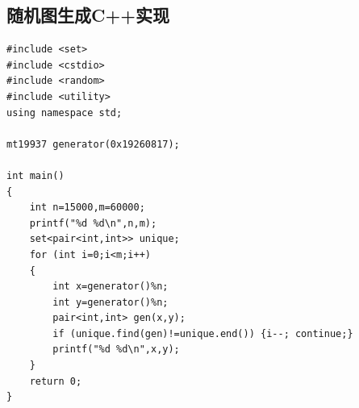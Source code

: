 \documentclass{article}
\begin{document}
\subsection{随机图生成C++实现}

\begin{lstlisting}
#include <set>
#include <cstdio>
#include <random>
#include <utility>
using namespace std;

mt19937 generator(0x19260817);

int main()
{
    int n=15000,m=60000;
    printf("%d %d\n",n,m);
    set<pair<int,int>> unique;
    for (int i=0;i<m;i++)
    {
        int x=generator()%n;
        int y=generator()%n;
        pair<int,int> gen(x,y);
        if (unique.find(gen)!=unique.end()) {i--; continue;}
        printf("%d %d\n",x,y);
    }
    return 0;
}
\end{lstlisting}
\end{document}
